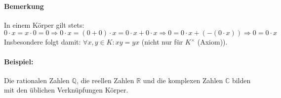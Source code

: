 \documentclass[12pt,a4paper,parskip=half-,DIV=15]{scrartcl}
\begin{document}
\paragraph{Bemerkung} In einem Körper gilt stets:
\begin{equation*}
0\cdot x = x\cdot 0 = 0 \Rightarrow
0\cdot x = (0+0)\cdot x = 0\cdot x + 0\cdot x \Rightarrow
0 = 0\cdot x + (-(0\cdot x)) \Rightarrow 0 = 0\cdot x
\end{equation*}
Insbesondere folgt damit: $\forall x,y\in K: xy = yx$ (nicht nur für $K^\times$ (Axiom)).
\paragraph{Beispiel:} Die rationalen Zahlen $\mathbb{Q}$, die reellen Zahlen $\mathbb{R}$ und die komplexen Zahlen $\mathbb{C}$ bilden mit den üblichen Verknüpfungen Körper.

\end{document}
